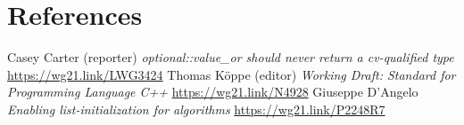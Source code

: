 \documentclass[11pt]{article}
\begin{document}
\section{References}
\renewcommand{\section}[2]{}%
\begin{thebibliography}{9}
  Casey Carter (reporter)\newline
  \emph{optional::value\_or should never return a cv-qualified type}\newline
  \url{https://wg21.link/LWG3424}
  Thomas Köppe (editor)\newline
  \emph{Working Draft: Standard for Programming Language C++}\newline
  \url{https://wg21.link/N4928}
  Giuseppe D'Angelo\newline
  \emph{Enabling list-initialization for algorithms}\newline
  \url{https://wg21.link/P2248R7}
\end{thebibliography}
\end{document}
